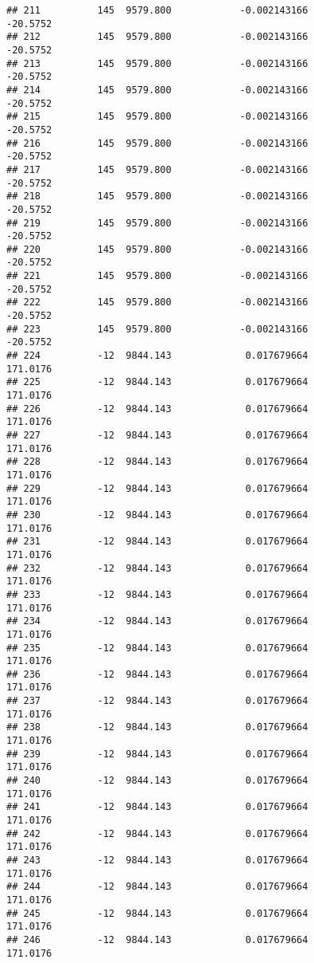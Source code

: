 \documentclass[]{article}
\begin{document}
\begin{verbatim}
## 211          145  9579.800            -0.002143166           -20.5752
## 212          145  9579.800            -0.002143166           -20.5752
## 213          145  9579.800            -0.002143166           -20.5752
## 214          145  9579.800            -0.002143166           -20.5752
## 215          145  9579.800            -0.002143166           -20.5752
## 216          145  9579.800            -0.002143166           -20.5752
## 217          145  9579.800            -0.002143166           -20.5752
## 218          145  9579.800            -0.002143166           -20.5752
## 219          145  9579.800            -0.002143166           -20.5752
## 220          145  9579.800            -0.002143166           -20.5752
## 221          145  9579.800            -0.002143166           -20.5752
## 222          145  9579.800            -0.002143166           -20.5752
## 223          145  9579.800            -0.002143166           -20.5752
## 224          -12  9844.143             0.017679664           171.0176
## 225          -12  9844.143             0.017679664           171.0176
## 226          -12  9844.143             0.017679664           171.0176
## 227          -12  9844.143             0.017679664           171.0176
## 228          -12  9844.143             0.017679664           171.0176
## 229          -12  9844.143             0.017679664           171.0176
## 230          -12  9844.143             0.017679664           171.0176
## 231          -12  9844.143             0.017679664           171.0176
## 232          -12  9844.143             0.017679664           171.0176
## 233          -12  9844.143             0.017679664           171.0176
## 234          -12  9844.143             0.017679664           171.0176
## 235          -12  9844.143             0.017679664           171.0176
## 236          -12  9844.143             0.017679664           171.0176
## 237          -12  9844.143             0.017679664           171.0176
## 238          -12  9844.143             0.017679664           171.0176
## 239          -12  9844.143             0.017679664           171.0176
## 240          -12  9844.143             0.017679664           171.0176
## 241          -12  9844.143             0.017679664           171.0176
## 242          -12  9844.143             0.017679664           171.0176
## 243          -12  9844.143             0.017679664           171.0176
## 244          -12  9844.143             0.017679664           171.0176
## 245          -12  9844.143             0.017679664           171.0176
## 246          -12  9844.143             0.017679664           171.0176

\end{verbatim}
\end{document}
